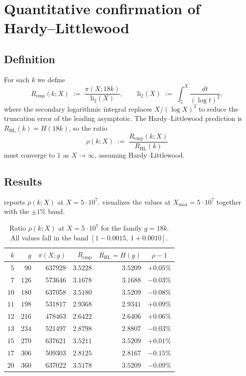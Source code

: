 \documentclass[11pt]{amsart}
\theoremstyle{plain}
\theoremstyle{definition}
\theoremstyle{remark}
\begin{document}
\section{Quantitative confirmation of Hardy--Littlewood}\label{sec:HL_confirm}

\subsection{Definition}

For each $k$ we define
\begin{equation}\label{eq:Remp}
  R_{\mathrm{emp}}(k; X) \;:=\; \frac{\pi(X; 18k)}{\mathrm{li}_2(X)},
  \qquad
  \mathrm{li}_2(X) \;:=\; \int_5^X \frac{dt}{(\log t)^2},
\end{equation}
where the secondary logarithmic integral replaces $X/(\log X)^2$ to
reduce the truncation error of the leading asymptotic. The
Hardy--Littlewood prediction is $R_{\mathrm{HL}}(k) = H(18k)$, so the
ratio
\begin{equation}\label{eq:ratio}
  \rho(k;X) \;:=\; \frac{R_{\mathrm{emp}}(k;X)}{R_{\mathrm{HL}}(k)}
\end{equation}
must converge to $1$ as $X \to \infty$, assuming Hardy--Littlewood.

\subsection{Results}

 reports $\rho(k; X)$ at $X = 5 \cdot 10^7$.
 visualizes the values at
$X_{\max} = 5\cdot 10^7$ together with the $\pm 1\%$ band.

\begin{table}[h]
\centering
\caption{Ratio $\rho(k;X)$ at $X = 5 \cdot 10^7$ for the family
$g=18k$. All values fall in the band
$[1 - 0.0015,\ 1 + 0.0010]$.}
\label{tab:HL_confirm}
\begin{tabular}{@{}r r r r r r@{}}
\toprule
$k$ & $g$ & $\pi(X;g)$ & $R_{\mathrm{emp}}$ &
$R_{\mathrm{HL}}=H(g)$ & \multicolumn{1}{c}{$\rho - 1$} \\
\midrule
$5$  & $90$  & \num{637928} & $3.5228$ & $3.5209$ & $+0.05\%$ \\
$7$  & $126$ & \num{573646} & $3.1678$ & $3.1688$ & $-0.03\%$ \\
$10$ & $180$ & \num{637058} & $3.5180$ & $3.5209$ & $-0.08\%$ \\
$11$ & $198$ & \num{531817} & $2.9368$ & $2.9341$ & $+0.09\%$ \\
$12$ & $216$ & \num{478463} & $2.6422$ & $2.6406$ & $+0.06\%$ \\
$13$ & $234$ & \num{521497} & $2.8798$ & $2.8807$ & $-0.03\%$ \\
$15$ & $270$ & \num{637621} & $3.5211$ & $3.5209$ & $+0.01\%$ \\
$17$ & $306$ & \num{509303} & $2.8125$ & $2.8167$ & $-0.15\%$ \\
$20$ & $360$ & \num{637022} & $3.5178$ & $3.5209$ & $-0.09\%$ \\
\bottomrule
\end{tabular}
\end{table}
\end{document}
